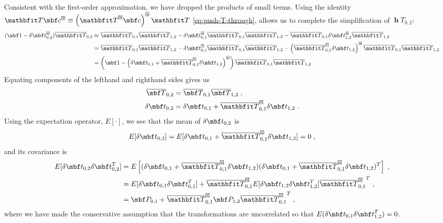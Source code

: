 \documentclass[11pt,a4,oneside]{article}
\begin{document}
Consistent with the first-order approximation, we have dropped the products of small terms. Using the identity $\mbfh T \mbf c^\boxplus \equiv \left(\mbfh T^\boxtimes \mbf c\right)^\boxplus \mbfh T$ \eqref{eq:push-T-through}, allows us to complete the simplification of $\mbfh T_{0,2}$:
\begin{subequations}
	\begin{flalign}
			(\mbf 1 - \mbfdel t_{0,2}^\boxplus)\mbfhbar T_{0,2} &\approx \mbfhbar T_{0,1} \mbfhbar T_{1,2} - \mbfdel t_{0,1}^\boxplus  \mbfhbar T_{0,1} \mbfhbar T_{1,2} -  \mbfhbar T_{0,1} \mbfdel t_{1,2}^\boxplus \mbfhbar T_{1,2}\\
			&= \mbfhbar T_{0,1} \mbfhbar T_{1,2} - \mbfdel t_{0,1}^\boxplus  \mbfhbar T_{0,1} \mbfhbar T_{1,2} -  \left(\mbfhbar T_{0,1}^\boxtimes \mbfdel t_{1,2}\right)^\boxplus \mbfhbar T_{0,1} \mbfhbar T_{1,2}\\
			&= \left(\mbf 1 - \left(\mbfdel t_{0,1} + \mbfhbar T_{0,1}^\boxtimes \mbfdel t_{1,2}\right)^\boxplus \right) \mbfhbar T_{0,1} \mbfhbar T_{1,2}
	\end{flalign}
\end{subequations}
Equating components of the lefthand and righthand sides gives us
\begin{subequations}
	\begin{flalign}
		\mbfbar T_{0,2} &= \mbfbar T_{0,1} \mbfbar T_{1,2}\;,\\
		\mbfdel t_{0,2} &= \mbfdel t_{0,1} + \mbfhbar T_{0,1}^\boxtimes \mbfdel t_{1,2} \;.
	\end{flalign}
\end{subequations}
Using the expectation operator, $E[\cdot]$, we see that the mean of $\mbfdel t_{0,2}$ is
\begin{equation}
	E[\mbfdel t_{0,2}] = E[\mbfdel t_{0,1} + \mbfhbar T_{0,1}^\boxtimes \mbfdel t_{1,2} ] = 0\;,
\end{equation}
and its covariance is
\begin{subequations}
	\begin{flalign}
		E[\mbfdel t_{0,2}\mbfdel t_{0,2}^T] &= E\left[(\mbfdel t_{0,1} + \mbfhbar T_{0,1}^\boxtimes \mbfdel t_{1,2} )(\mbfdel t_{0,1} + \mbfhbar T_{0,1}^\boxtimes \mbfdel t_{1,2} )^T\right]\;,\\
		&=E[\mbfdel t_{0,1}\mbfdel t_{0,1}^T] + \mbfhbar T_{0,1}^\boxtimes E[ \mbfdel t_{1,2} \mbfdel t_{1,2}^T ] {\mbfhbar T_{0,1}^\boxtimes}^T\;,\\
		&=\mbf P_{0,1} + \mbfhbar T_{0,1}^\boxtimes \mbf P_{1,2} {\mbfhbar T_{0,1}^\boxtimes}^T\;, \label{eq:compound-covariance}
	\end{flalign}
\end{subequations}
where we have made the conservative assumption that the transformations are uncorrelated so that $E(\mbfdel t_{0,1} \mbfdel t_{1,2}^T) = 0$.
\end{document}
